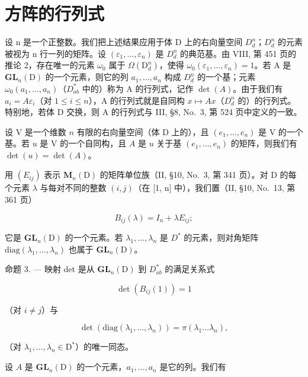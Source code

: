 \section{方阵的行列式}

设 n 是一个正整数。我们把上述结果应用于体 D 上的右向量空间 \(D_{d}^{n}\)；\(D_{d}^{n}\) 的元素被视为 n 行一列的矩阵。设 \((\varepsilon_{1},\ldots,\varepsilon_{n})\) 是 \(D_{d}^{n}\) 的典范基。由 VIII, 第 451 页的推论 2，存在唯一的元素 \(\omega_{0}\) 属于 \(\Omega(\mathrm{D}_{d}^{n})\)，使得 \(\omega_{0}(\varepsilon_{1},\ldots,\varepsilon_{n})=1\)。若 A 是 \(\mathbf{GL}_{n}(\mathrm{D})\) 的一个元素，则它的列 \(a_{1},\ldots,a_{n}\) 构成 \(D_{d}^{n}\) 的一个基；元素 \(\omega_{0}(a_{1},\ldots,a_{n})\)（\(D_{ab}^{*}\) 中的）称为 A 的行列式，记作 \(\det(A)\)。由于我们有 \(a_{i}=A\varepsilon_{i}\)（对 \(1\leqslant i\leqslant n\)），A 的行列式就是自同构 \(x\mapsto Ax\)（\(D_{d}^{n}\) 的）的行列式。特别地，若体 D 交换，则 A 的行列式与 III, §8, No.~3, 第 524 页中定义的一致。

设 \(\mathrm{V}\) 是一个维数 \(n\) 有限的右向量空间（体 \(\mathrm{D}\) 上的），且 \((e_1, \ldots, e_n)\) 是 \(\mathrm{V}\) 的一个基。若 \(u\) 是 \(\mathrm{V}\) 的一个自同构，且 \(A\) 是 \(u\) 关于基 \((e_1, \ldots, e_n)\) 的矩阵，则我们有 \(\det(u) = \det(A)\)。

用 \((E_{ij})\) 表示 \(\mathbf{M}_{n}(\mathrm{D})\) 的矩阵单位族（II, §10, No.~3, 第 341 页）。对 D 的每个元素 \(\lambda\) 与每对不同的整数 \((i,j)\)（在 {[}1, n{]} 中），我们置（II, §10, No.~13, 第 361 页）

\[
B _ {i j} (\lambda) = I _ {n} + \lambda E _ {i j};
\]

它是 \(\mathbf{GL}_{n}(\mathrm{D})\) 的一个元素。若 \(\lambda_{1},\ldots,\lambda_{n}\) 是 \(D^{*}\) 的元素，则对角矩阵 \(\mathrm{diag}(\lambda_{1},\ldots,\lambda_{n})\) 也属于 \(\mathbf{GL}_{n}(\mathrm{D})\)。

命题 3. --- 映射 det 是从 \(\mathbf{GL}_{n}(\mathrm{D})\) 到 \(D_{ab}^{*}\) 的满足关系式

\[
\det (B _ {i j} (1)) = 1\tag{16}
\]

（对 \(i\neq j\)）与

\[
\det (\mathrm{diag} (\lambda_ {1}, \ldots , \lambda_ {n})) = \pi (\lambda_ {1} \dots \lambda_ {n}),\tag{17}
\]

（对 \(\lambda_1, \ldots, \lambda_n \in \mathrm{D}^*\)）的唯一同态。

设 \(A\) 是 \(\mathbf{GL}_n(\mathrm{D})\) 的一个元素，\(a_1, \ldots, a_n\) 是它的列。我们有

